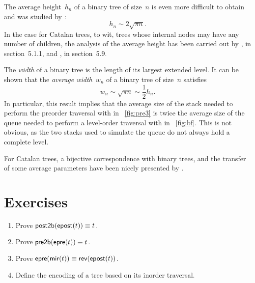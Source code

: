 
The average height~\(h_n\) of a
binary tree of size~\(n\) is even more difficult to obtain and was
studied by
\cite{FlajoletOdlyzko_1981,BrownShubert_1984,FlajoletOdlyzko_1984,Odlyzko_1984}:
\begin{equation*}
h_n \sim 2 \sqrt{\pi n}.
\end{equation*}
In the case for Catalan trees, to wit, trees whose internal nodes may
have any number of children, the analysis of the average height has
been carried out by \cite{DasarathyYang_1980,DershowitzZaks_1981},
\cite{Kemp_1984} in section~5.1.1,
\cite{DershowitzZaks_1990,KnuthdeBruijnRice_2000b} and
\cite{SedgewickFlajolet_1996}, in
section~5.9.


The \emph{width} of a binary tree is the
length of its largest extended level. It can be shown that the \emph{average
  width}~\(w_n\) of a binary tree of
size~\(n\) satisfies
\begin{equation*}
w_n \sim \sqrt{\pi n} \sim \frac{1}{2} h_n.
\end{equation*}
In particular, this result implies that the average size of the stack
needed to perform the preorder traversal with
 in
\fig~\vref{fig:pre3} is twice the average size of the queue needed to
perform a level\hyp{}order traversal with
 in \fig~\vref{fig:bf}. This is not
obvious, as the two stacks used to simulate the queue do not always
hold a complete level.

For Catalan trees, a bijective correspondence with binary trees, and
the transfer of some average parameters have been nicely presented by
\cite{DasarathyYang_1980}.

\section*{Exercises}

\begin{enumerate}

  \item Prove \(\textsf{post2b}(\textsf{epost}(t)) \equiv t\).

  \item Prove \(\textsf{pre2b}(\textsf{epre}(t)) \equiv t\).

  \item Prove \(\textsf{epre}(\textsf{mir}(t)) \equiv
    \textsf{rev}(\textsf{epost}(t))\).

  \item Define the encoding of a tree based on its inorder traversal.

\end{enumerate}
